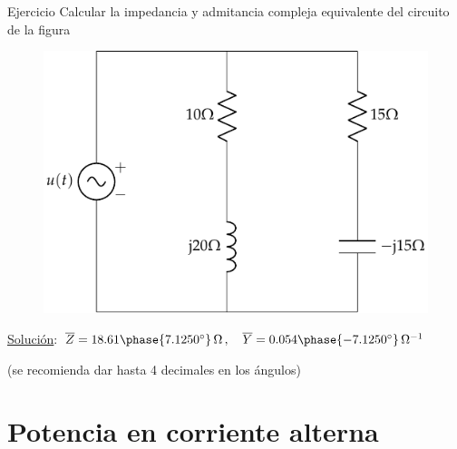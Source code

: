 \documentclass[aspectratio=169, usenames,svgnames,dvipsnames]{beamer}
\begin{document}

\begin{frame}{Ejercicio}
    \vspace{3mm}
    Calcular la impedancia y admitancia compleja equivalente del circuito de la figura
    \begin{figure}[H]
        \centering
        \includegraphics[height=0.64\textheight]{../figs/impedancia_admitancia_eq.pdf}
    \end{figure}

    \small{\alert{\href{https://raw.githubusercontent.com/ETSIDI-IE/tc/master/docs/ejercicios_clase/TC1_02_Ejemplo_2_7_libro_LBB.pdf}{Solución}}: \hspace{2mm}$\overline{Z} = 18.61\phase{\ang{7.1250}} \,\si{\ohm} \, , \quad \overline{Y} = 0.054\phase{\ang{-7.1250}} \,\si{\per\ohm}$ 
    
    \hspace{17mm}(se recomienda dar hasta 4 decimales en los ángulos)}
\end{frame}


\section{Potencia en corriente alterna}
\end{document}
